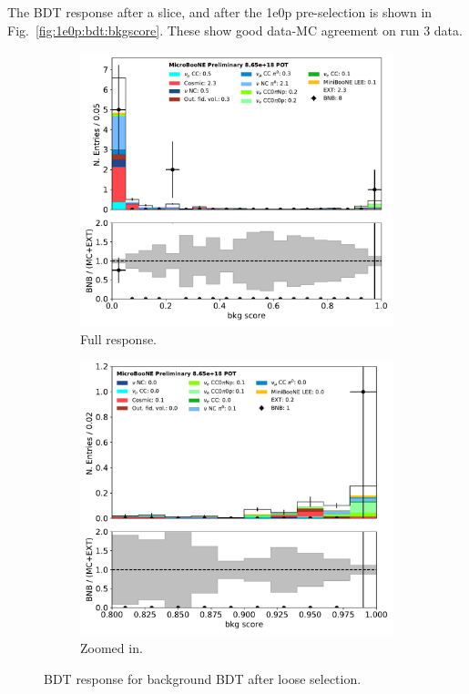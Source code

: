 \documentclass[a4paper]{article}
\begin{document}
The BDT response after a slice, and after the 1e0p pre-selection is shown in Fig.~\ref{fig:1e0p:bdt:bkgscore}.  These show good data-MC agreement on run 3 data.

\begin{figure}[H] 
\begin{center}
    \begin{subfigure}[b]{0.45\textwidth}
    \centering
    \includegraphics[width=1.00\textwidth]{1e0p/bkg_score_01162020_RUN3_loosesel.pdf}
    \caption{\label{fig:1e0p:bdt:bkgscore:loose} Full response.}
    \end{subfigure}
    \begin{subfigure}[b]{0.45\textwidth}
    \centering
    \includegraphics[width=1.00\textwidth]{1e0p/bkg_score_01162020_RUN3_loosesel_zoom.pdf}
    \caption{\label{fig:1e0p:bdt:bkgscore:loosezoom} Zoomed in.}
    \end{subfigure}
\caption{\label{fig:1e0p:bdt:loose} BDT response for background BDT after loose selection.}
\end{center}
\end{figure}
\end{document}
